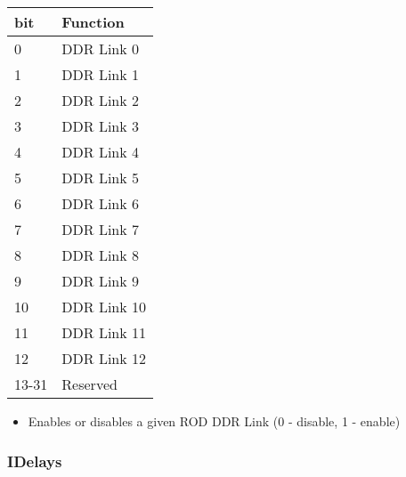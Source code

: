 \begin {table}[H]
\begin{center}
\begin{tabular}{|l|l|}
\hline
\textbf{bit} & \textbf{Function} \\
\hline
0 & DDR Link 0 \\
\hline
1 & DDR Link 1 \\
\hline
2 & DDR Link 2 \\
\hline
3 & DDR Link 3 \\
\hline
4 & DDR Link 4 \\
\hline
5 & DDR Link 5 \\
\hline
6 & DDR Link 6 \\
\hline
7 & DDR Link 7 \\
\hline
8 & DDR Link 8 \\
\hline
9 & DDR Link 9 \\
\hline
10 & DDR Link 10 \\
\hline
11 & DDR Link 11 \\
\hline
12 & DDR Link 12 \\
\hline
13-31 & Reserved \\
\hline
\end{tabular}
\end{center}
\end{table}


\begin{itemize}
\item Enables or disables a given ROD DDR Link (0 - disable, 1 - enable)
\end{itemize}




\subsubsection{IDelays}

